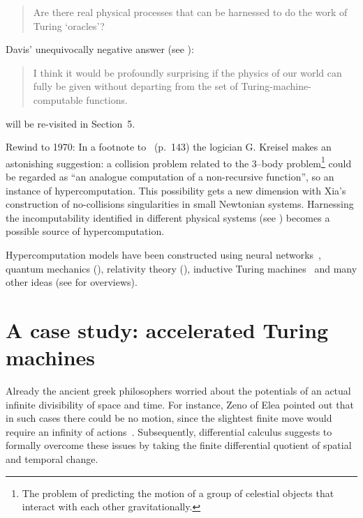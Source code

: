 \documentclass{comjnl}
\begin{document}
 \begin{quote}
Are there real physical  processes that can be harnessed to do the work
of Turing `oracles'? \end{quote}

Davis' unequivocally negative answer (see \cite{Davis-2004,Davis-2006}):

 \begin{quote}
  I think it would be profoundly surprising if the physics of our world can fully be given
without departing from the set of Turing-machine-computable functions.
\end{quote}
will be re-visited
 in Section~5.

 Rewind to 1970:  In a footnote  to~\cite{kreisel-1970} (p.\ 143) the logician G. Kreisel makes an astonishing suggestion:   a collision problem related to the 3--body problem\footnote{The problem of predicting the motion of a group of celestial objects that interact with each other gravitationally. }
 could be regarded as ``an analogue computation of a non-recursive function'', so an instance of hypercomputation. This possibility  gets a new dimension with Xia's~\cite{xia-92}   construction of no-collisions singularities in small Newtonian systems.  Harnessing the incomputability identified  in different physical systems (see \cite{pr1,penrose:90,cooper-2003}) becomes a possible  source of hypercomputation.


   Hypercomputation models have been constructed using neural networks~\cite{siegel95}, quantum mechanics (\cite{nielsen-1997,kieu-02a,2002-cal-pav}),
 relativity theory (\cite{Hogarth92,Etesi-02,Nemeti2006118,andreka-2009}), inductive Turing machines~\cite{burgin-2005} and many other ideas (see \cite{ord-2006,burgin-2005} for overviews).




 \section{A case study: accelerated Turing machines}


Already the ancient greek philosophers worried about the potentials of an actual infinite divisibility of space and time.
For instance, Zeno of Elea pointed out that in such cases there could be no motion,
since the slightest finite move would require an infinity of actions~\cite{zeno,Sainsbury,salmon-01}.
Subsequently, differential calculus suggests to formally overcome these issues by taking the finite differential
quotient of spatial and temporal change.
\end{document}
